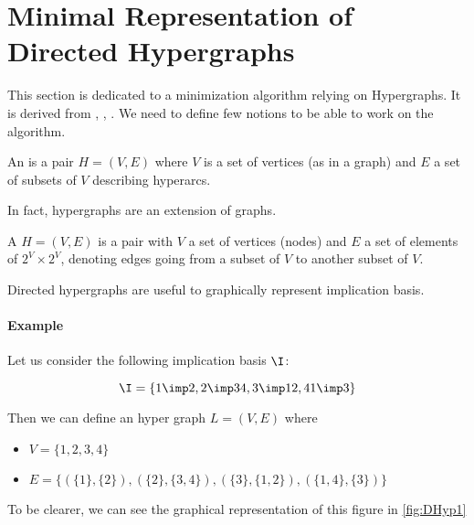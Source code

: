 \section{Minimal Representation of Directed Hypergraphs}

This section is dedicated to a minimization algorithm relying on Hypergraphs. 
It is derived from \cite{Hyp}, \cite{FD-graph}, \cite{Hyp-Intro}. We need to
define few notions to be able to work on the algorithm. 

\begin{definition} An  is a pair $H = 
(V, E)$ 
where $V$ is a set of vertices (as in a graph) and $E$ a set of subsets of $V$
describing hyperarcs.

\end{definition}

\noindent In fact, hypergraphs are an extension of graphs. 

\begin{definition} A  
$H = (V, E)$ is a pair with $V$ a set of vertices (nodes) and $E$ a set of 
elements of $2^V \times 2^V$, denoting edges going from a subset of $V$ to 
another subset of $V$.
	
\end{definition}

Directed hypergraphs are useful to graphically represent implication basis.

\paragraph{Example} Let us consider the following implication basis $\I$:

	\[ \I = \{ 1 \imp 2, 2 \imp 34, 3 \imp 12, 41 \imp 3 \} \]

\noindent Then we can define an hyper graph $L = (V, E)$ where
	\begin{itemize}
		\item $V = \{1, 2, 3, 4 \}$
		\item $E = \{ (\{ 1 \}, \{ 2\}), (\{ 2 \}, \{3, 4\}),
			(\{ 3 \}, \{ 1, 2\}), (\{1, 4\}, \{ 3\}) \}$
	\end{itemize}

\noindent To be clearer, we can see the graphical representation of this figure
in \ref{fig:DHyp1}

\begin{center}
	
\end{center}


